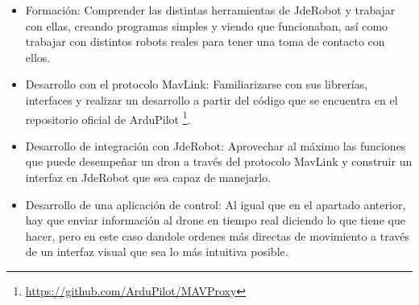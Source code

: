 \begin{itemize}
\item{Formación:} Comprender las distintas herramientas de JdeRobot y trabajar con ellas, creando programas simples y viendo que funcionaban, así como trabajar con distintos robots reales para tener una toma de contacto con ellos. 

\item{Desarrollo con el protocolo MavLink:} Familiarizarse con sus librerías, interfaces y realizar un desarrollo a partir del código que se encuentra en el repositorio oficial de ArduPilot \footnote{\url{https://github.com/ArduPilot/MAVProxy}}.

\item{Desarrollo de integración con JdeRobot:} Aprovechar al máximo las funciones que puede desempeñar un dron a través del protocolo MavLink y construir un interfaz en JdeRobot que sea capaz de manejarlo.

\item{Desarrollo de una aplicación de control:} Al igual que en el apartado anterior, hay que enviar información al drone en tiempo real diciendo lo que tiene que hacer, pero en este caso dandole ordenes más directas de movimiento a través de un interfaz visual que sea lo más intuitiva posible.


\end{itemize}
